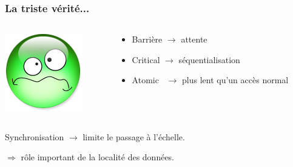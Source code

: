 \documentclass[xcolor={x11names,svgnames}]{beamer}
\begin{document}
\begin{frame}
  \frametitle{La triste vérité...}

    \begin{columns}[c]
    \begin{column}{.1\textwidth}
      \includegraphics[width=\textwidth]{triste.png}
    \end{column}
    \begin{column}{.9\textwidth}

      
  \begin{itemize}
  \item Barrière $\rightarrow$ attente
  \item Critical $\rightarrow$ séquentialisation
  \item Atomic~  $\rightarrow$ plus lent qu'un accès normal
  \end{itemize}

\end{column}
\end{columns}

\bigskip
  
  Synchronisation $\rightarrow$ limite le passage à l'échelle.

  \bigskip

  $\Longrightarrow$ rôle important de la localité des données.
\end{frame}
\end{document}
